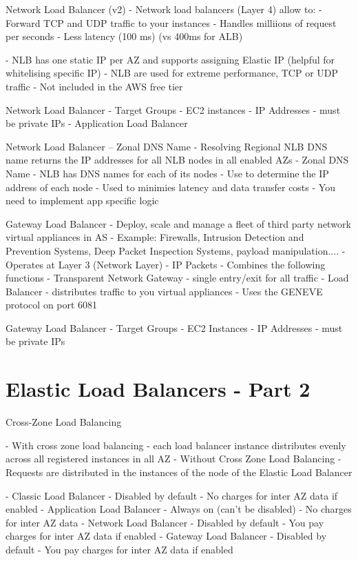 \documentclass[11pt]{book}
\begin{document}
    Network Load Balancer (v2)
    - Network load balancers (Layer 4) allow to:
        - Forward TCP and UDP traffic to your instances
        - Handles milliions of request per seconds
        - Less latency (100 ms) (vs 400ms for ALB)

    - NLB has one static IP per AZ and supports assigning Elastic IP (helpful for whitelising specific IP)
    - NLB are used for extreme performance, TCP or UDP traffic
    - Not included in the AWS free tier

    Network Load Balancer - Target Groups
    - EC2 instances
    - IP Addresses - must be private IPs
    - Application Load Balancer

    Network Load Balancer -- Zonal DNS Name
    - Resolving Regional NLB DNS name returns the IP addresses for all NLB nodes in all enabled AZs
    - Zonal DNS Name
        - NLB has DNS names for each of its nodes
        - Use to determine the IP address of each node
        - Used to minimies latency and data transfer costs
        - You need to implement app specific logic

    Gateway Load Balancer
    - Deploy, scale and manage a fleet of third party network virtual appliances in AS
    - Example: Firewalls, Intrusion Detection and Prevention Systems, Deep Packet Inspection Systems, payload manipulation....
    - Operates at Layer 3 (Network Layer) - IP Packets
    - Combines the following functions
        - Transparent Network Gateway - single entry/exit for all traffic
        - Load Balancer - distributes traffic to you virtual appliances
    - Uses the GENEVE protocol on port 6081

    Gateway Load Balancer - Target Groups
    - EC2 Instances
    - IP Addresses - must be private IPs

    \section{Elastic Load Balancers - Part 2}
    Cross-Zone Load Balancing

    - With cross zone load balancing - each load balancer instance distributes evenly across all registered instances in all AZ
    - Without Cross Zone Load Balancing - Requests are distributed in the instances of the node of the Elastic Load Balancer

    - Classic Load Balancer
        - Disabled by default
        - No charges for inter AZ data if enabled
    - Application Load Balancer
        - Always on (can't be disabled)
        - No charges for inter AZ data
    - Network Load Balancer
        - Disabled by default
        - You pay charges for inter AZ data if enabled
    - Gateway Load Balancer
        - Disabled by default
        - You pay charges for inter AZ data if enabled
\end{document}

